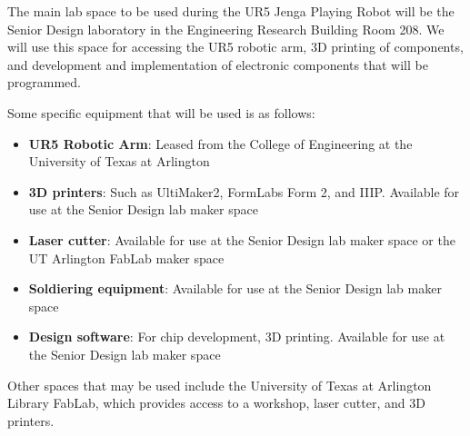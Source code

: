 The main lab space to be used during the UR5 Jenga Playing Robot will be the Senior Design laboratory in the Engineering Research Building Room 208. We will use this space for accessing the UR5 robotic arm, 3D printing of components, and development and implementation of electronic components that will be programmed. 

Some specific equipment that will be used is as follows:
\begin{itemize}
    \item \textbf{UR5 Robotic Arm}: Leased from the College of Engineering at the University of Texas at Arlington
    \item \textbf{3D printers}: Such as UltiMaker2, FormLabs Form 2, and IIIP. Available for use at the Senior Design lab maker space
    \item \textbf{Laser cutter}: Available for use at the Senior Design lab maker space or the UT Arlington FabLab maker space
    \item \textbf{Soldiering equipment}: Available for use at the Senior Design lab maker space
    \item \textbf{Design software}:  For chip development, 3D printing. Available for use at the Senior Design lab maker space
\end{itemize}

Other spaces that may be used include the University of Texas at Arlington Library FabLab, which provides access to a workshop, laser cutter, and 3D printers. 